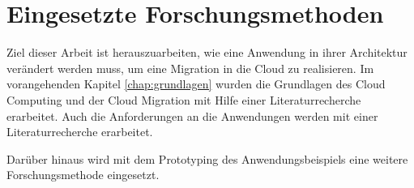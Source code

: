 
\chapter{Eingesetzte Forschungsmethoden}

Ziel dieser Arbeit ist herauszuarbeiten, wie eine Anwendung in ihrer Architektur verändert werden muss,
um eine Migration in die Cloud zu realisieren. Im vorangehenden Kapitel \ref{chap:grundlagen} wurden die Grundlagen des
Cloud Computing und der Cloud Migration mit Hilfe einer Literaturrecherche erarbeitet. Auch die Anforderungen an die
Anwendungen werden mit einer Literaturrecherche erarbeitet.

Darüber hinaus wird mit dem Prototyping des Anwendungsbeispiels eine weitere Forschungsmethode eingesetzt.


